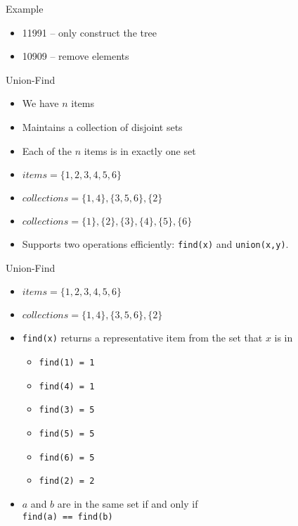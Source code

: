 \documentclass[12pt,t]{beamer}
\newcommand{\bi}{\begin{itemize}}
\newcommand{\ei}{\end{itemize}}
\begin{document}
\begin{frame}[fragile]{Example}

    \bi
      \item 11991 -- only construct the tree
      \item 10909 -- remove elements
    \ei
\end{frame}


\begin{frame}[fragile]{Union-Find}
    \vspace{20pt}
    \bi
        \item We have $n$ items
        \item Maintains a collection of disjoint sets
        \item Each of the $n$ items is in exactly one set
        \vspace{10pt}
        \item $items = \{1,2,3,4,5,6\}$
        \item $collections = \{1,4\}, \{3,5,6\}, \{2\}$
        \item $collections = \{1\}, \{2\}, \{3\}, \{4\}, \{5\}, \{6\}$
        \vspace{10pt}
        \item Supports two operations efficiently: \texttt{find(x)} and \texttt{union(x,y)}.
    \ei
\end{frame}

\begin{frame}{Union-Find}
    \bi
        \vspace{10pt}
        \item $items = \{1,2,3,4,5,6\}$
        \item $collections = \{1,4\}, \{3,5,6\}, \{2\}$
        \vspace{10pt}
        \item \texttt{find(x)} returns a representative item from the set that $x$ is in
            \bi
                \vspace{5pt}
                \item \texttt{find(1) = 1}
                \item \texttt{find(4) = 1}
                \vspace{5pt}
                \item \texttt{find(3) = 5}
                \item \texttt{find(5) = 5}
                \item \texttt{find(6) = 5}
                \vspace{5pt}
                \item \texttt{find(2) = 2}
            \ei
        \vspace{5pt}
        \item $a$ and $b$ are in the same set if and only if \\ \texttt{find(a) == find(b)}
    \ei
\end{frame}
\end{document}
